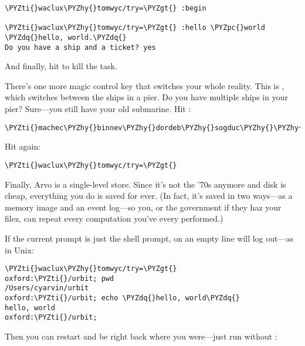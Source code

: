 \begin{framed_shaded}
\begin{Verbatim}[fontsize=\relsize{-2.5},fontseries=b,commandchars=\\\{\}]
\PYZti{}waclux\PYZhy{}tomwyc/try=\PYZgt{} :begin

\PYZti{}waclux\PYZhy{}tomwyc/try=\PYZgt{} :hello \PYZpc{}world
\PYZdq{}hello, world.\PYZdq{}
Do you have a ship and a ticket? yes
\end{Verbatim}
\end{framed_shaded}
And finally, hit  to kill the task.

There's one more magic control key that switches your whole
reality.  This is , which switches between the ships in a pier.
Do you have multiple ships in your pier?  Sure---you still have
your old submarine.  Hit :

\begin{framed_shaded}
\begin{Verbatim}[fontsize=\relsize{-2.5},fontseries=b,commandchars=\\\{\}]
\PYZti{}machec\PYZhy{}binnev\PYZhy{}dordeb\PYZhy{}sogduc\PYZhy{}\PYZhy{}dosmul\PYZhy{}sarrum\PYZhy{}faplec\PYZhy{}nidted/try=\PYZgt{}
\end{Verbatim}
\end{framed_shaded}
Hit  again:

\begin{framed_shaded}
\begin{Verbatim}[fontsize=\relsize{-2.5},fontseries=b,commandchars=\\\{\}]
\PYZti{}waclux\PYZhy{}tomwyc/try=\PYZgt{}
\end{Verbatim}
\end{framed_shaded}
Finally, Arvo is a single-level store.  Since it's not the '70s
anymore and disk is cheap, everything you do is saved for ever.
(In fact, it's saved in two ways---as a memory image and an event
log---so you, or the government if they haz your filez, can
repeat every computation you've every performed.)

If the current prompt is just the shell prompt,  on an empty
line will log out---as in Unix:

\begin{framed_shaded}
\begin{Verbatim}[fontsize=\relsize{-2.5},fontseries=b,commandchars=\\\{\}]
\PYZti{}waclux\PYZhy{}tomwyc/try=\PYZgt{}
oxford:\PYZti{}/urbit; pwd
/Users/cyarvin/urbit
oxford:\PYZti{}/urbit; echo \PYZdq{}hello, world\PYZdq{}
hello, world
oxford:\PYZti{}/urbit;
\end{Verbatim}
\end{framed_shaded}
Then you can restart and be right back where you were---just
run  without :

